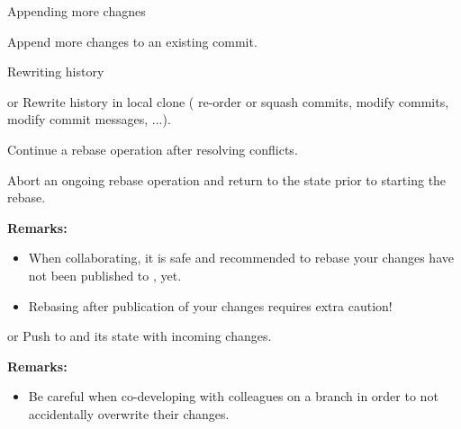 \begin{frame}{Appending more chagnes}
\begin{block}{}
Append more changes to an existing commit.
\end{block}
\end{frame}

\begin{frame}{Rewriting history}
\begin{block}{ or }
Rewrite history in local clone ({\eg} re-order or squash commits, modify commits, modify commit messages, ...).
\end{block}
\begin{block}{}
Continue a rebase operation after resolving conflicts.
\end{block}
\begin{block}{}
Abort an ongoing rebase operation and return to the state prior to starting the rebase.
\end{block}
\textbf{Remarks:}
\begin{itemize}
\item When collaborating, it is safe and recommended to rebase  your changes have not been published to , yet.
\item Rebasing after publication of your changes requires extra caution!
\end{itemize}

\end{frame}

\begin{frame}
\begin{block}{ or }
Push to  and  its state with incoming changes.
\end{block}
\textbf{Remarks:}
\begin{itemize}
\item Be careful when co-developing with colleagues on a branch in order to not accidentally overwrite their changes.
\end{itemize}
\end{frame}

%


